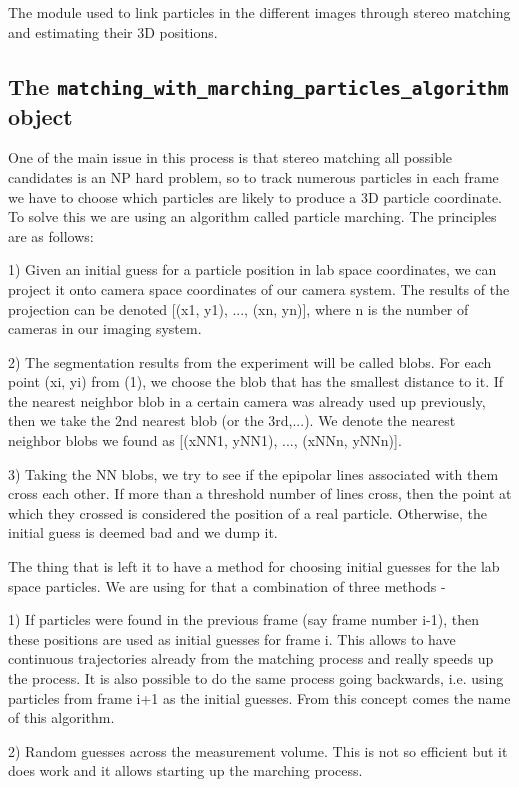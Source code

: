 \documentclass[10pt,a4paper]{article}
\begin{document}
The module used to link particles in the different images through stereo matching and estimating their 3D positions. 



\subsection{The \texttt{matching\_with\_marching\_particles\_algorithm} object}


One of the main issue in this process is that stereo matching all possible candidates is an NP hard problem, so to track numerous particles in each frame we have to choose which particles are likely to produce a 3D particle coordinate. To solve this we are using an algorithm called particle marching. The principles are as follows:

1) Given an initial guess for a particle position in lab space coordinates, we can project it onto camera space coordinates of our camera system. The results of the projection can be denoted [(x1, y1), ..., (xn, yn)], where n is the number of cameras in our imaging system.

2) The segmentation results from the experiment will be called blobs. For each point (xi, yi) from (1), we choose the blob that has the smallest distance to it. If the nearest neighbor blob in a certain camera was already used up previously, then we take the 2nd nearest blob (or the 3rd,...). We denote the nearest neighbor blobs we found as [(xNN1, yNN1), ..., (xNNn, yNNn)]. 

3) Taking the NN blobs, we try to see if the epipolar lines associated with them cross each other. If more than a threshold number of lines cross, then the point at which they crossed is considered the position of a real particle. Otherwise, the initial guess is deemed bad and we dump it.

The thing that is left it to have a method for choosing initial guesses for the lab space particles. We are using for that a combination of three methods - 

1) If particles were found in the previous frame (say frame number i-1), then these positions are used as initial guesses for frame i. This allows to have continuous trajectories already from the matching process and really speeds up the process. It is also possible to do the same process going backwards, i.e. using particles from frame i+1 as the initial guesses. From this concept comes the name of this algorithm.

2) Random guesses across the measurement volume. This is not so efficient but it does work and it allows starting up the marching process.
\end{document}
